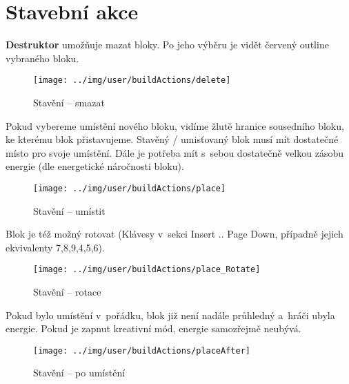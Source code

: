 
\section{Stavební akce}

\textbf{Destruktor} umožňuje mazat bloky. Po jeho výběru je vidět červený outline vybraného bloku.

\begin{figure}[!ht]\centering
\texttt{[image: ../img/user/buildActions/delete]}

\caption{Stavění -- smazat}
\label{fig:user_buildActions_delete}

\end{figure}

\FloatBarrier

Pokud vybereme umístění nového bloku, vidíme žlutě hranice sousedního bloku, ke kterému blok přistavujeme. Stavěný / umisťovaný blok musí mít dostatečné místo pro svoje umístění. Dále je potřeba mít s~sebou dostatečně velkou zásobu energie (dle energetické náročnosti bloku).

\begin{figure}[!ht]\centering
\texttt{[image: ../img/user/buildActions/place]}

\caption{Stavění -- umístit}
\label{fig:user_buildActions_place}

\end{figure}

\FloatBarrier

Blok je též možný rotovat (Klávesy v~sekci Insert .. Page Down, případně jejich ekvivalenty 7,8,9,4,5,6).

\begin{figure}[!ht]\centering
\texttt{[image: ../img/user/buildActions/place\_Rotate]}

\caption{Stavění -- rotace}
\label{fig:user_buildActions_place_Rotate}

\end{figure}

\FloatBarrier

Pokud bylo umístění v~pořádku, blok již není nadále průhledný a~hráči ubyla energie. Pokud je zapnut kreativní mód, energie samozřejmě neubývá.

\begin{figure}[!ht]\centering
\texttt{[image: ../img/user/buildActions/placeAfter]}

\caption{Stavění -- po umístění}
\label{fig:user_buildActions_placeAfter}

\end{figure}


\FloatBarrier